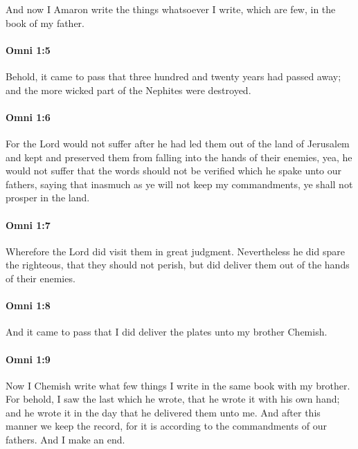 			And now I Amaron write the things whatsoever I write,
			which are few, in the book of my father.

		\paragraph{Omni 1:5} %
			\label{OMNI-1-5}

			Behold, it came to pass that three hundred and twenty years had passed away;
			and the more wicked part of the Nephites were destroyed.

		\paragraph{Omni 1:6} %
			\label{OMNI-1-6}

			For the Lord would not suffer
			after he had led them out of the land of Jerusalem
			and kept and preserved them from falling into the hands of their enemies,
			yea, he would not suffer that the words should not be verified
			which he spake unto our fathers,
			saying that inasmuch as ye will not keep my commandments,
			ye shall not prosper in the land.

		\paragraph{Omni 1:7} %
			\label{OMNI-1-7}

			Wherefore the Lord did visit them in great judgment.
			Nevertheless he did spare the righteous, that they should not perish,
			but did deliver them out of the hands of their enemies.

		\paragraph{Omni 1:8} %
			\label{OMNI-1-8}

			And it came to pass that I did deliver the plates unto my brother Chemish.

		\paragraph{Omni 1:9} %
			\label{OMNI-1-9}

			Now I Chemish write what few things I write in the same book with my brother.
			For behold, I saw the last which he wrote,
			that he wrote it with his own hand;
			and he wrote it in the day that he delivered them unto me.
			And after this manner we keep the record,
			for it is according to the commandments of our fathers.
			And I make an end.

